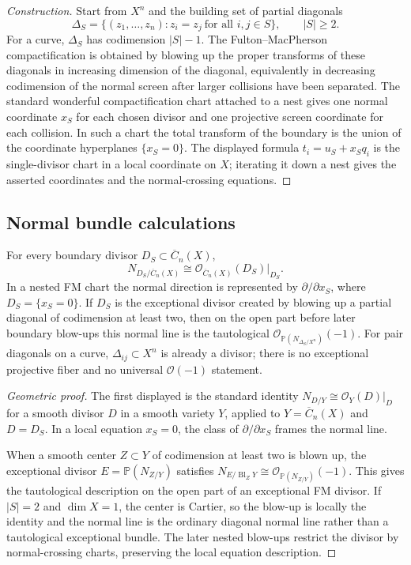 \begin{proof}[Construction]
Start from $X^n$ and the building set of partial diagonals
\[
\Delta_S=\{(z_1,\ldots,z_n):z_i=z_j\ \text{for all }i,j\in S\},
\qquad |S|\geq2.
\]
For a curve, $\Delta_S$ has codimension $|S|-1$. The
Fulton--MacPherson compactification is obtained by blowing up the
proper transforms of these diagonals in increasing dimension of the
diagonal, equivalently in decreasing codimension of the normal screen
after larger collisions have been separated. The standard wonderful
compactification chart attached to a nest gives one normal coordinate
$x_S$ for each chosen divisor and one projective screen coordinate for
each collision. In such a chart the total transform of the boundary is
the union of the coordinate hyperplanes $\{x_S=0\}$. The displayed
formula $t_i=u_S+x_Sq_i$ is the single-divisor chart in a local
coordinate on $X$; iterating it down a nest gives the asserted
coordinates and the normal-crossing equations.
\end{proof}

\subsection{Normal bundle calculations}

\begin{theorem}\label{thm:normal-bundle-formula}
For every boundary divisor $D_S\subset\overline C_n(X)$,
\[
N_{D_S/\overline C_n(X)}
\cong
\mathcal O_{\overline C_n(X)}(D_S)\big|_{D_S}.
\]
In a nested FM chart the normal direction is represented by
$\partial/\partial x_S$, where $D_S=\{x_S=0\}$. If $D_S$ is the
exceptional divisor created by blowing up a partial diagonal of
codimension at least two, then on the open part before later boundary
blow-ups this normal line is the tautological
$\mathcal O_{\mathbb P(N_{\Delta_S/X^n})}(-1)$. For pair diagonals on a
curve, $\Delta_{ij}\subset X^n$ is already a divisor; there is no
exceptional projective fiber and no universal $\mathcal O(-1)$
statement.
\end{theorem}

\begin{proof}[Geometric proof]
The first displayed is the standard identity
$N_{D/Y}\cong\mathcal O_Y(D)|_D$ for a smooth divisor $D$ in a smooth
variety $Y$, applied to
$Y=\overline C_n(X)$ and $D=D_S$. In a local equation $x_S=0$, the
class of $\partial/\partial x_S$ frames the normal line.

When a smooth center $Z\subset Y$ of codimension at least two is blown
up, the exceptional divisor $E=\mathbb P(N_{Z/Y})$ satisfies
$N_{E/\operatorname{Bl}_Z Y}\cong
\mathcal O_{\mathbb P(N_{Z/Y})}(-1)$. This gives the tautological
description on the open part of an exceptional FM divisor. If
$|S|=2$ and $\dim X=1$, the center is Cartier, so the blow-up is
locally the identity and the normal line is the ordinary diagonal normal
line rather than a tautological exceptional bundle. The later nested
blow-ups restrict the divisor by normal-crossing charts, preserving the
local equation description.
\end{proof}


